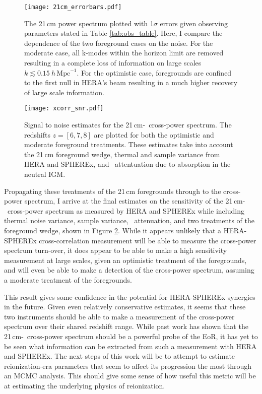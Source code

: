 \begin{figure}[th]
	\centering
	\texttt{[image: 21cm\_errorbars.pdf]}
	\caption[Optimistic vs. Moderate Foreground Treatment]{The 21\,cm power spectrum plotted with 1$\sigma$ errors given
																												 observing parameters stated in Table \ref{tab:obs_table}. Here, I compare the
																												 dependence of the two foreground cases on the noise. For the moderate case,
																												 all k-modes within the horizon limit are removed resulting in a complete loss of information on large scales $k \lesssim 0.15 \ h\,\textrm{Mpc}^{-1}$. For the optimistic case, foregrounds are confined to the first null in HERA's beam resulting in a much higher recovery of large scale information.}
	\label{fig:21cm_errors}
\end{figure}

\begin{figure}[th]
	\centering
	\texttt{[image: xcorr\_snr.pdf]}
	\caption[Cross-Power Spectrum Signal-to-Noise]{Signal to noise estimates for the 21\,cm-\lya\ cross-power spectrum.
	The redshifts $z = [6, 7, 8]$ are plotted for both the optimistic and moderate foreground treatments. These estimates take
	into account the 21\,cm foreground wedge, thermal and sample variance from HERA and SPHEREx, and \lya\ attentuation due to
	absorption in the neutral IGM.}
	\label{fig:snr}
\end{figure}


Propagating these treatments of the 21\,cm foregrounds through to the cross-power spectrum, I arrive
at the final estimates on the sensitivity of the 21\,cm-\lya\ cross-power spectrum as measured
by HERA and SPHEREx while including thermal noise variance, sample variance, \lya\ attenuation,
and two treatments of the foreground wedge, shown in Figure \ref{fig:snr}. While it appears unlikely that a HERA-SPHEREx
cross-correlation measurement will be able to measure the cross-power spectrum turn-over,
it does appear to be able to make a high sensitivity measurement at large scales,
given an optimistic treatment of the foregrounds, and will even be able to make a detection
of the cross-power spectrum, assuming a moderate treatment of the foregrounds.

This result gives some confidence in the potential for HERA-SPHEREx synergies
in the future. Given even relatively conservative estimates, it seems that these
two instruments should be able to make a measurement of the cross-power spectrum
over their shared redshift range. While past work has shown that the 21\,cm-\lya\
cross-power spectrum should be a powerful probe of the EoR, it has yet to be seen
what information can be extracted from such a measurement with HERA and SPHEREx.
The next steps of this work will be to attempt to estimate reionization-era
parameters that seem to affect its progression the most through an MCMC analysis.
This should give some sense of how useful this metric will be at estimating the
underlying physics of reionization.
